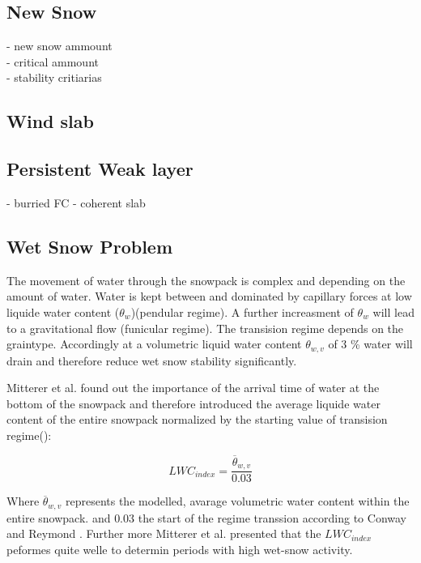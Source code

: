 \subsection{New Snow}
- new snow ammount \\
- critical ammount \\
- stability critiarias

\subsection{Wind slab}


\subsection{Persistent Weak layer}
- burried FC 
- coherent slab

\subsection{Wet Snow Problem}
The movement of water through the snowpack is complex and depending on the amount of water.
Water is kept between and dominated by capillary forces at low liquide water content ($\theta_w$)(pendular regime).
A further increasment of $\theta_w$ will lead to a gravitational flow (funicular regime). The transision regime
depends on the graintype. Accordingly at a volumetric liquid water content $\theta_{w,v}$ of 3 \% water will drain and
therefore reduce wet snow stability significantly.\autocite{mittererOperationalSupportingTool2013} 

\noindent Mitterer et al. found out the importance of the arrival time of water at the bottom of the snowpack and therefore
introduced the average liquide water content of the entire snowpack normalized by the starting value of transision 
regime(\autocite{mittererOperationalSupportingTool2013}):

 \begin{equation}
    LWC_{index} = \frac{  \overline{ \theta}_{w,v }    } {0.03} 
    \label{equ:LWC}
 \end{equation}

\noindent Where $\overline{ \theta}_{w,v }$ represents the modelled, avarage volumetric water content within the 
entire snowpack. and $0.03$ the start of the regime transsion according to Conway and Reymond \autocite{conwaySnowStabilityRain1993}.
Further more Mitterer et al. presented that the $LWC_{index}$ peformes quite welle to determin periods with high 
wet-snow activity.\autocite{mittererOperationalSupportingTool2013} 


